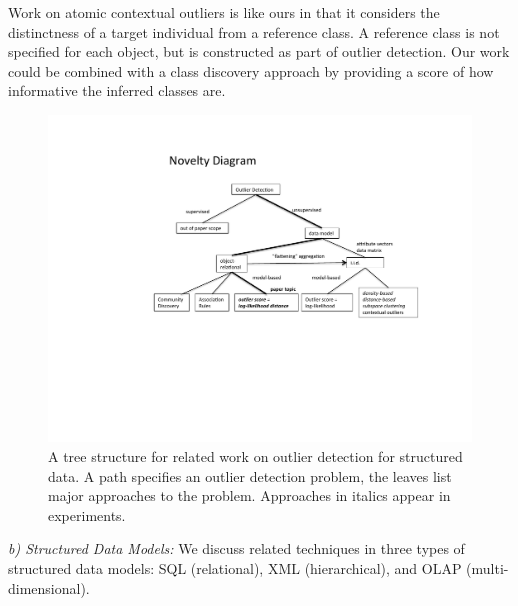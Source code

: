{				Work on atomic contextual  outliers \citep{Tang2013} is like ours in that it considers the distinctness of a target individual from a reference class. A reference class is not specified for each object,
				but is constructed as part of outlier detection. 
				Our work could be combined with a class discovery approach by providing a score of how informative the inferred classes are. 
				\begin{figure}
					\centering
					\includegraphics[width=1\textwidth] {NoveltyDiagram.pdf}
					\caption{A tree structure for related work on outlier detection for structured data. A path specifies an outlier detection problem, the leaves list major approaches to the problem. Approaches in italics appear in experiments.
						\label{fig:novelty}}
				\end{figure}
				
				\textit{b) Structured Data Models:} We discuss related techniques in three types of structured data models: SQL (relational), XML (hierarchical), and OLAP (multi-dimensional). 
				
}
